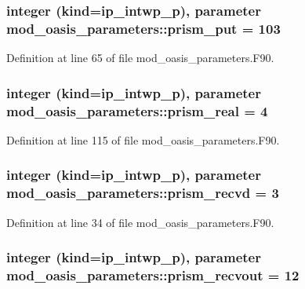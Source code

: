 \hypertarget{classmod__oasis__parameters_ad8db79b2d411e8f04445dcc2ed619548}{
\subsubsection[{prism\+\_\+put}]{\setlength{\rightskip}{0pt plus 5cm}integer (kind=ip\+\_\+intwp\+\_\+p), parameter mod\+\_\+oasis\+\_\+parameters\+::prism\+\_\+put = 103}}\label{classmod__oasis__parameters_ad8db79b2d411e8f04445dcc2ed619548}


Definition at line 65 of file mod\+\_\+oasis\+\_\+parameters.\+F90.

\hypertarget{classmod__oasis__parameters_a02e0627219e7769df37e3d55da46f65d}{
\subsubsection[{prism\+\_\+real}]{\setlength{\rightskip}{0pt plus 5cm}integer (kind=ip\+\_\+intwp\+\_\+p), parameter mod\+\_\+oasis\+\_\+parameters\+::prism\+\_\+real = 4}}\label{classmod__oasis__parameters_a02e0627219e7769df37e3d55da46f65d}


Definition at line 115 of file mod\+\_\+oasis\+\_\+parameters.\+F90.

\hypertarget{classmod__oasis__parameters_aa0bc3b208a1f962e5ec08916b36cae2d}{
\subsubsection[{prism\+\_\+recvd}]{\setlength{\rightskip}{0pt plus 5cm}integer (kind=ip\+\_\+intwp\+\_\+p), parameter mod\+\_\+oasis\+\_\+parameters\+::prism\+\_\+recvd = 3}}\label{classmod__oasis__parameters_aa0bc3b208a1f962e5ec08916b36cae2d}


Definition at line 34 of file mod\+\_\+oasis\+\_\+parameters.\+F90.

\hypertarget{classmod__oasis__parameters_ab56f2573ea7fd626f24e42606f4745a2}{
\subsubsection[{prism\+\_\+recvout}]{\setlength{\rightskip}{0pt plus 5cm}integer (kind=ip\+\_\+intwp\+\_\+p), parameter mod\+\_\+oasis\+\_\+parameters\+::prism\+\_\+recvout = 12}}\label{classmod__oasis__parameters_ab56f2573ea7fd626f24e42606f4745a2}


